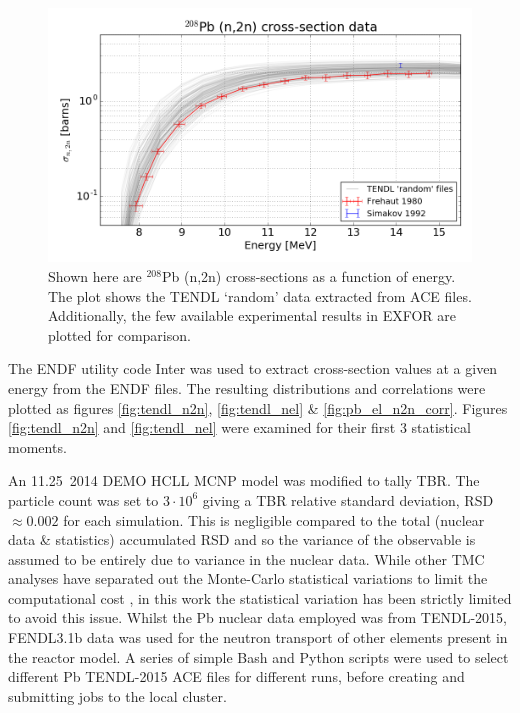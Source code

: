 
\begin{figure}
  \centering
  \includegraphics[width=\textwidth]{pb208_n2n_tendl_exfor.png}
  \caption{Shown here are $^{208}$Pb (n,2n) cross-sections as a function of energy. The plot shows the TENDL `random' data extracted from ACE files. Additionally, the few available experimental results in EXFOR are plotted for comparison.}
  \label{fig:tendl_lead}
\end{figure}

The ENDF utility code Inter was used to extract cross-section values at a given energy from the ENDF files. The resulting distributions and correlations were plotted as figures \ref{fig:tendl_n2n}, \ref{fig:tendl_nel} \& \ref{fig:pb_el_n2n_corr}. Figures \ref{fig:tendl_n2n} and \ref{fig:tendl_nel} were examined for their first 3 statistical moments. 

An 11.25\degree \ 2014 DEMO HCLL MCNP model was modified to tally TBR. The particle count was set to $3\cdot10^{6}$ giving a TBR relative standard deviation, RSD $\approx 0.002$ for each simulation. This is negligible compared to the total (nuclear data \& statistics) accumulated RSD and so the variance of the observable is assumed to be entirely due to variance in the nuclear data. While other TMC analyses have separated out the Monte-Carlo statistical variations to limit the computational cost \cite{Rochman2014a}, in this work the statistical variation has been strictly limited to avoid this issue. Whilst the Pb nuclear data employed was from TENDL-2015, FENDL3.1b data was used for the neutron transport of other elements present in the reactor model. A series of simple Bash and Python scripts were used to select different Pb TENDL-2015 ACE files for different runs, before creating and submitting jobs to the local cluster.


